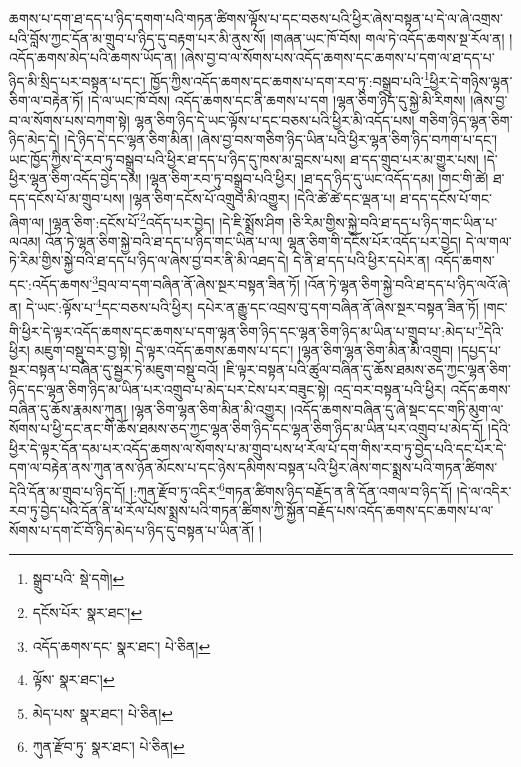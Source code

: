ཆགས་པ་དག་ཐ་དད་པ་ཉིད་དགག་པའི་གཏན་ཚིགས་ལྟོས་པ་དང་བཅས་པའི་ཕྱིར་ཞེས་བསྟན་པ་དེ་ལ་ཞེ་འགྲས་པའི་བློས་ཀྱང་དོན་མ་གྲུབ་པ་ཉིད་དུ་བརྟག་པར་མི་ནུས་སོ། །གཞན་ཡང་ཁོ་བོས། གལ་ཏེ་འདོད་ཆགས་སྔ་རོལ་ན། །འདོད་ཆགས་མེད་པའི་ཆགས་ཡོད་ན། །ཞེས་བྱ་བ་ལ་སོགས་པས་འདོད་ཆགས་དང་ཆགས་པ་དག་ལ་ཐ་དད་པ་ཉིད་མི་སྲིད་པར་བསྟན་པ་དང་། ཁྱོད་ཀྱིས་འདོད་ཆགས་དང་ཆགས་པ་དག་རབ་ཏུ་:བསྒྲུབ་པའི་\footnote{སྒྲུབ་པའི་  སྡེ་དགེ། }ཕྱིར་དེ་གཉིས་ལྷན་ཅིག་ལ་བརྟེན་ཏོ། །དེ་ལ་ཡང་ཁོ་བོས། འདོད་ཆགས་དང་ནི་ཆགས་པ་དག །ལྷན་ཅིག་ཉིད་དུ་སྐྱེ་མི་རིགས། །ཞེས་བྱ་བ་ལ་སོགས་པས་བཀག་སྟེ། ལྷན་ཅིག་ཉིད་དེ་ཡང་ལྟོས་པ་དང་བཅས་པའི་ཕྱིར་མི་འདོད་པས། གཅིག་ཉིད་ལྷན་ཅིག་ཉིད་མེད་དེ། །དེ་ཉིད་དེ་དང་ལྷན་ཅིག་མིན། །ཞེས་བྱ་བས་གཅིག་ཉིད་ཡིན་པའི་ཕྱིར་ལྷན་ཅིག་ཉིད་བཀག་པ་དང་། ཡང་ཁྱོད་ཀྱིས་དེ་རབ་ཏུ་བསྒྲུབ་པའི་ཕྱིར་ཐ་དད་པ་ཉིད་དུ་ཁས་མ་བླངས་པས། ཐ་དད་གྲུབ་པར་མ་གྱུར་པས། །དེ་ཕྱིར་ལྷན་ཅིག་འདོད་བྱེད་དམ། །ལྷན་ཅིག་རབ་ཏུ་བསྒྲུབ་པའི་ཕྱིར། །ཐ་དད་ཉིད་དུ་ཡང་འདོད་དམ། །གང་གི་ཚེ། ཐ་དད་དངོས་པོ་མ་གྲུབ་པས། །ལྷན་ཅིག་དངོས་པོ་འགྲུབ་མི་འགྱུར། །དེའི་ཚེ་ཚེ་དང་ལྡན་པ། ཐ་དད་དངོས་པོ་གང་ཞིག་ལ། །ལྷན་ཅིག་:དངོས་པོ་\footnote{དངོས་པོར་  སྣར་ཐང་། }འདོད་པར་བྱེད། །དེ་ཇི་སྨྲོས་ཤིག །ཅི་རིམ་གྱིས་སྐྱེ་བའི་ཐ་དད་པ་ཉིད་གང་ཡིན་པ་ལའམ། འོན་ཏེ་ལྷན་ཅིག་སྐྱེ་བའི་ཐ་དད་པ་ཉིད་གང་ཡིན་པ་ལ། ལྷན་ཅིག་གི་དངོས་པོར་འདོད་པར་བྱེད། དེ་ལ་གལ་ཏེ་རིམ་གྱིས་སྐྱེ་བའི་ཐ་དད་པ་ཉིད་ལ་ཞེས་བྱ་བར་ནི་མི་འཐད་དེ། དེ་ནི་ཐ་དད་པའི་ཕྱིར་དཔེར་ན། འདོད་ཆགས་དང་:འདོད་ཆགས་\footnote{འདོད་ཆགས་དང་  སྣར་ཐང་།  པེ་ཅིན། }བྲལ་བ་དག་བཞིན་ནོ་ཞེས་སྔར་བསྟན་ཟིན་ཏོ། །འོན་ཏེ་ལྷན་ཅིག་སྐྱེ་བའི་ཐ་དད་པ་ཉིད་ལའོ་ཞེ་ན། དེ་ཡང་:ལྟོས་པ་\footnote{ལྟོས་  སྣར་ཐང་། }དང་བཅས་པའི་ཕྱིར། དཔེར་ན་རྒྱུ་དང་འབྲས་བུ་དག་བཞིན་ནོ་ཞེས་སྔར་བསྟན་ཟིན་ཏོ། །གང་གི་ཕྱིར་དེ་ལྟར་འདོད་ཆགས་དང་ཆགས་པ་དག་ལྷན་ཅིག་ཉིད་དང་ལྷན་ཅིག་ཉིད་མ་ཡིན་པ་གྲུབ་པ་:མེད་པ་\footnote{མེད་པས་  སྣར་ཐང་།  པེ་ཅིན། }དེའི་ཕྱིར། མཇུག་བསྡུ་བར་བྱ་སྟེ། དེ་ལྟར་འདོད་ཆགས་ཆགས་པ་དང་། །ལྷན་ཅིག་ལྷན་ཅིག་མིན་མི་འགྲུབ། །དཔྱད་པ་སྔར་བསྟན་པ་བཞིན་དུ་སྦྱར་ཏེ་མཇུག་བསྡུ་བའོ། །ཇི་ལྟར་བསྟན་པའི་ཚུལ་བཞིན་དུ་ཆོས་ཐམས་ཅད་ཀྱང་ལྷན་ཅིག་ཉིད་དང་ལྷན་ཅིག་ཉིད་མ་ཡིན་པར་འགྲུབ་པ་མེད་པར་ངེས་པར་བཟུང་སྟེ། འདྲ་བར་བསྟན་པའི་ཕྱིར། འདོད་ཆགས་བཞིན་དུ་ཆོས་རྣམས་ཀུན། །ལྷན་ཅིག་ལྷན་ཅིག་མིན་མི་འགྱུར། །འདོད་ཆགས་བཞིན་དུ་ཞེ་སྡང་དང་གཏི་མུག་ལ་སོགས་པ་ཕྱི་དང་ནང་གི་ཆོས་ཐམས་ཅད་ཀྱང་ལྷན་ཅིག་ཉིད་དང་ལྷན་ཅིག་ཉིད་མ་ཡིན་པར་འགྲུབ་པ་མེད་དོ། །དེའི་ཕྱིར་དེ་ལྟར་དོན་དམ་པར་འདོད་ཆགས་ལ་སོགས་པ་མ་གྲུབ་པས་ཕ་རོལ་པོ་དག་གིས་རབ་ཏུ་བྱེད་པའི་དང་པོར་དེ་དག་ལ་བརྟེན་ནས་ཀུན་ནས་ཉོན་མོངས་པ་དང་ཉེས་དམིགས་བསྟན་པའི་ཕྱིར་ཞེས་གང་སྨྲས་པའི་གཏན་ཚིགས་དེའི་དོན་མ་གྲུབ་པ་ཉིད་དོ། །:ཀུན་རྫོབ་ཏུ་འདིར་\footnote{ཀུན་རྫོབ་ཏུ་  སྣར་ཐང་།  པེ་ཅིན། }གཏན་ཚིགས་ཉིད་བརྗོད་ན་ནི་དོན་འགལ་བ་ཉིད་དོ། །དེ་ལ་འདིར་རབ་ཏུ་བྱེད་པའི་དོན་ནི་ཕ་རོལ་པོས་སྨྲས་པའི་གཏན་ཚིགས་ཀྱི་སྐྱོན་བརྗོད་པས་འདོད་ཆགས་དང་ཆགས་པ་ལ་སོགས་པ་དག་ངོ་བོ་ཉིད་མེད་པ་ཉིད་དུ་བསྟན་པ་ཡིན་ནོ། །
